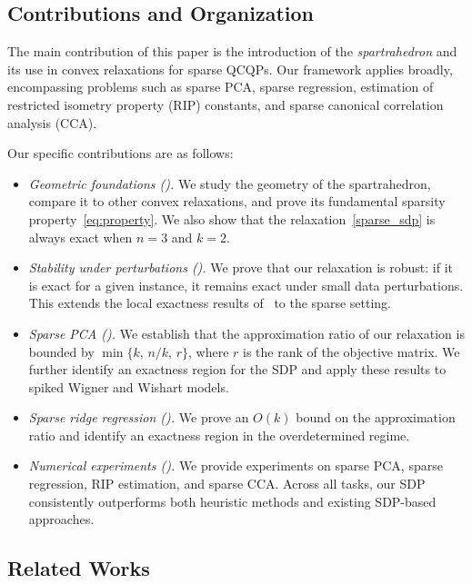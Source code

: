 \documentclass[11pt]{amsart}
\newcommand{\ourset}{spartrahedron\xspace}
\theoremstyle{plain}
\theoremstyle{definition}
\theoremstyle{remark}
\begin{document}
	\subsection*{Contributions and Organization}
	
	The main contribution of this paper is the introduction of the \emph{\ourset} and its use in convex relaxations for sparse QCQPs.
	Our framework applies broadly, encompassing problems such as sparse PCA, sparse regression, estimation of restricted isometry property (RIP) constants, and sparse canonical correlation analysis (CCA).
	
	Our specific contributions are as follows:
	\begin{itemize}
		\item \emph{Geometric foundations ().}
		We study the geometry of the \ourset, compare it to other convex relaxations, and prove its fundamental sparsity property~\eqref{eq:property}.
		We also show that the relaxation~\eqref{sparse_sdp} is always exact when $n=3$ and $k=2$.
		
		\item \emph{Stability under perturbations ().}
		We prove that our relaxation is robust: if it is exact for a given instance, it remains exact under small data perturbations.
		This extends the local exactness results of~\cite{cifuentes2022local} to the sparse setting.
		
		\item \emph{Sparse PCA ().}
		We establish that the approximation ratio of our relaxation is bounded by $\min\{k,\, n/k,\, r\}$, where $r$ is the rank of the objective matrix.
		We further identify an exactness region for the SDP and apply these results to spiked Wigner and Wishart models.
		
		\item \emph{Sparse ridge regression ().}
		We prove an $O(k)$ bound on the approximation ratio and identify an exactness region in the overdetermined regime.
		
		\item \emph{Numerical experiments ().}
		We provide experiments on sparse PCA, sparse regression, RIP estimation, and sparse CCA.
		Across all tasks, our SDP consistently outperforms both heuristic methods and existing SDP-based approaches.
	\end{itemize}
	
	\subsection*{Related Works}
	
\end{document}
